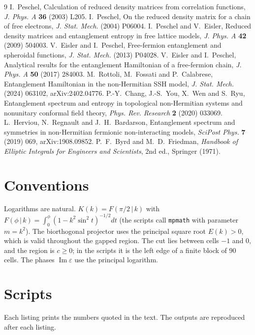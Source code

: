 \documentclass[11pt]{article}
\theoremstyle{definition}
\newcommand{\Ima}{\operatorname{Im}}
\begin{document}
\begin{thebibliography}{9}
 I.~Peschel, Calculation of reduced density matrices from correlation functions, \emph{J. Phys. A} \textbf{36} (2003) L205.
 I.~Peschel, On the reduced density matrix for a chain of free electrons, \emph{J. Stat. Mech.} (2004) P06004.
 I.~Peschel and V.~Eisler, Reduced density matrices and entanglement entropy in free lattice models, \emph{J. Phys. A} \textbf{42} (2009) 504003.
 V.~Eisler and I.~Peschel, Free-fermion entanglement and spheroidal functions, \emph{J. Stat. Mech.} (2013) P04028.
 V.~Eisler and I.~Peschel, Analytical results for the entanglement Hamiltonian of a free-fermion chain, \emph{J. Phys. A} \textbf{50} (2017) 284003.
 M.~Rottoli, M.~Fossati and P.~Calabrese, Entanglement Hamiltonian in the non-Hermitian SSH model, \emph{J. Stat. Mech.} (2024) 063102, arXiv:2402.04776.
 P.-Y.~Chang, J.-S.~You, X.~Wen and S.~Ryu, Entanglement spectrum and entropy in topological non-Hermitian systems and nonunitary conformal field theory, \emph{Phys. Rev. Research} \textbf{2} (2020) 033069.
 L.~Herviou, N.~Regnault and J.~H.~Bardarson, Entanglement spectrum and symmetries in non-Hermitian fermionic non-interacting models, \emph{SciPost Phys.} \textbf{7} (2019) 069, arXiv:1908.09852.
 P.~F.~Byrd and M.~D.~Friedman, \emph{Handbook of Elliptic Integrals for Engineers and Scientists}, 2nd ed., Springer (1971).
\end{thebibliography}

\appendix
\section{Conventions}
Logarithms are natural. $K(k)=F(\pi/2\,|\,k)$ with $F(\phi\,|\,k)=\int_0^\phi(1-k^2\sin^2t)^{-1/2}dt$ (the scripts call \texttt{mpmath} with parameter $m=k^2$). The biorthogonal projector uses the principal square root $E(k)>0$, which is valid throughout the gapped region. The cut lies between cells $-1$ and $0$, and the region is $c\ge0$; in the scripts it is the left edge of a finite block of 90 cells. The phases $\Ima\varepsilon$ use the principal logarithm.

\section{Scripts}
Each listing prints the numbers quoted in the text. The outputs are reproduced after each listing.
\end{document}
